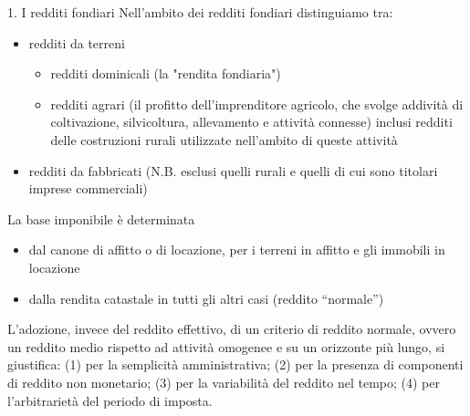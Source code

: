 \documentclass[11pt]{beamer}
\newcommand\€{\,\text{€}}
\begin{document}
\begin{frame}{1. I redditi fondiari}
Nell'ambito dei redditi fondiari distinguiamo tra:
\begin{itemize}
\item \alert{redditi da terreni}
\begin{itemize}
\item redditi \alert{dominicali} (la "rendita fondiaria")
\item redditi \alert{agrari} (il profitto dell'imprenditore agricolo, che svolge
addività di coltivazione, silvicoltura, allevamento e attività connesse)
inclusi redditi delle costruzioni rurali utilizzate nell'ambito di queste
attività
\end{itemize}
\item \alert{redditi da fabbricati} (N.B. esclusi quelli rurali e quelli di cui sono titolari
imprese commerciali)
\end{itemize}
La base imponibile è determinata
\begin{itemize}
\item dal \alert{canone di affitto o di locazione}, per i terreni in affitto e gli immobili
in locazione
\item dalla \alert{rendita catastale} in tutti gli altri casi (reddito ``normale'')
\end{itemize}
\begin{block}{}
\small
L'adozione, invece del reddito effettivo, di un criterio di \alert{reddito
normale}, ovvero un reddito medio rispetto ad attività omogenee e su un
orizzonte più lungo, si giustifica: (1) per la semplicità amministrativa; (2) per
la presenza di componenti di reddito non monetario; (3) per la variabilità del
reddito nel tempo; (4) per l'arbitrarietà del periodo di imposta.
\end{block}
\end{frame}
\end{document}
